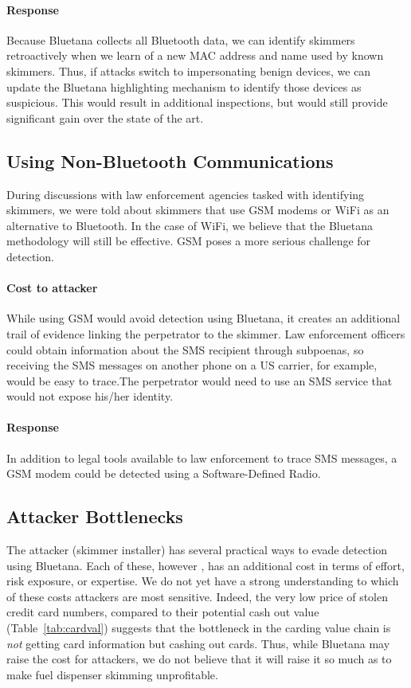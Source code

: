 \paragraph{Response} Because Bluetana collects all Bluetooth data, we can identify skimmers retroactively when we
learn of a new MAC address and name used by known skimmers. Thus, if attacks switch to impersonating benign devices,
we can update the Bluetana highlighting mechanism to identify those devices as suspicious. This would result in
additional inspections, but would still provide significant gain over the state of the art.

\subsection{Using Non-Bluetooth Communications}
During discussions with law enforcement agencies tasked with identifying skimmers, we were told about skimmers that
use GSM modems or WiFi as an alternative to Bluetooth. In the case of WiFi, we believe that the Bluetana methodology
will still be effective. GSM poses a more serious challenge for detection.

\paragraph{Cost to attacker}
While using GSM would avoid detection using Bluetana, it creates an additional trail of evidence linking the
perpetrator to the skimmer. Law enforcement officers could obtain information about the SMS recipient through
subpoenas, so receiving the SMS messages on another phone on a US carrier, for example, would be easy to trace.The
perpetrator would need to use an SMS service that would not expose his/her identity.

\paragraph{Response} In addition to legal tools available to law enforcement to trace SMS messages, a GSM modem could
be detected using a Software-Defined Radio.%

\subsection{Attacker Bottlenecks}
The attacker (skimmer installer) has several practical ways to evade detection using Bluetana. Each of these, however
, has an additional cost in terms of effort, risk exposure, or expertise. We do not yet have a strong
understanding to which of these costs attackers are most sensitive. Indeed, the very low price of stolen credit card
numbers, compared to their potential cash out value (Table~\ref{tab:cardval}) suggests that the bottleneck in the
carding value chain is \emph{not} getting card information but cashing out cards. Thus, while Bluetana may raise the
cost for attackers, we do not believe that it will raise it so much as to make fuel dispenser skimming unprofitable.
